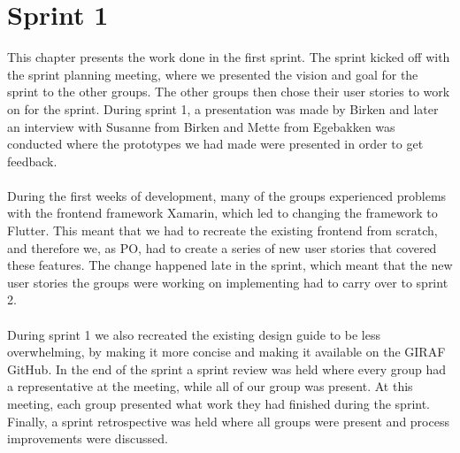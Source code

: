 \chapter{Sprint 1}
This chapter presents the work done in the first sprint.
The sprint kicked off with the sprint planning meeting, where we presented the vision and goal for the sprint to the other groups.
The other groups then chose their user stories to work on for the sprint.
During sprint 1, a presentation was made by Birken and later an interview with Susanne from Birken and Mette from Egebakken was conducted where the prototypes we had made were presented in order to get feedback.
\\\\
During the first weeks of development, many of the groups experienced problems with the frontend framework Xamarin, which led to changing the framework to Flutter.
This meant that we had to recreate the existing frontend from scratch, and therefore we, as PO, had to create a series of new user stories that covered these features.
The change happened late in the sprint, which meant that the new user stories the groups were working on implementing had to carry over to sprint 2.
\\\\
During sprint 1 we also recreated the existing design guide to be less overwhelming, by making it more concise and making it available on the GIRAF GitHub.
In the end of the sprint a sprint review was held where every group had a representative at the meeting, while all of our group was present.
At this meeting, each group presented what work they had finished during the sprint.
Finally, a sprint retrospective was held where all groups were present and process improvements were discussed.
